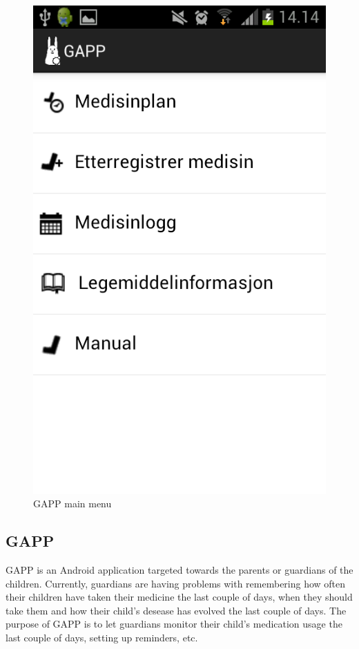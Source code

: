 \begin{figure}
\begin{minipage}[b]{0.4\linewidth}
		\includegraphics[width=0.20\paperwidth]{Pictures/app-screenshots/gapp_main_menu.png}
		\caption{GAPP main menu}
		\label{fig:gapp-main-menu}
	\end{minipage}
\end{figure}


\subsection{GAPP}
GAPP is an Android application targeted towards the parents or guardians of the children. 
Currently, guardians are having problems with remembering how often their children have taken their medicine the last couple of days, when they should take them and how their child's desease has evolved the last couple of days. The purpose of GAPP is to let guardians monitor their child's medication usage the last couple of days, setting up reminders, etc.

